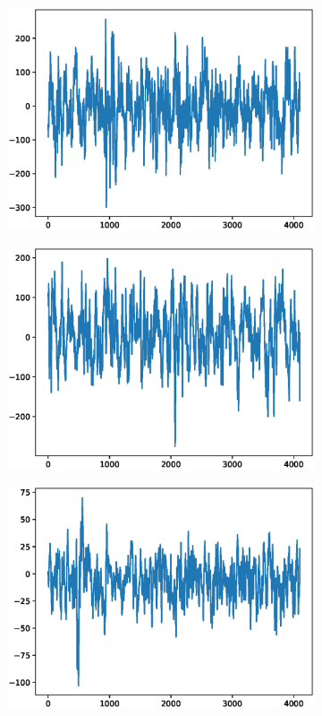 \documentclass[12pt]{article}
\begin{document}
\begin{figure}
\begin{subfigure}{.25\textwidth}
  \centering
  \includegraphics[width=.8\linewidth]{figures/signals/C/N015.eps}
\end{subfigure}%
\begin{subfigure}{.25\textwidth}
  \centering
  \includegraphics[width=.8\linewidth]{figures/signals/C/N024.eps}
\end{subfigure}
\begin{subfigure}{.25\textwidth}
  \centering
  \includegraphics[width=.8\linewidth]{figures/signals/C/N028.eps}

\end{subfigure}
\end{figure}
\end{document}
